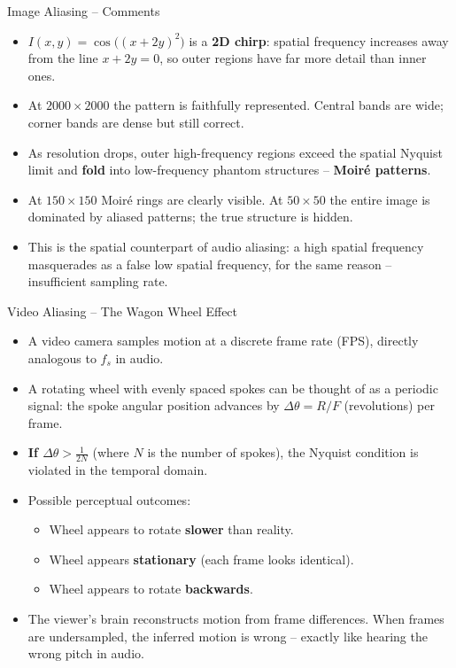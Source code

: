 \documentclass[aspectratio=169]{beamer}
\begin{document}
\begin{frame}{Image Aliasing -- Comments}
  \begin{itemize}
    \item $I(x,y)=\cos\!\big((x+2y)^2\big)$ is a \textbf{2D chirp}: spatial frequency increases away from the line $x+2y=0$, so outer regions have far more detail than inner ones.
    \item At $2000\times2000$ the pattern is faithfully represented. Central bands are wide; corner bands are dense but still correct.
    \item As resolution drops, outer high-frequency regions exceed the spatial Nyquist limit and \textbf{fold} into low-frequency phantom structures -- \textbf{Moir\'{e} patterns}.
    \item At $150\times150$ Moir\'{e} rings are clearly visible. At $50\times50$ the entire image is dominated by aliased patterns; the true structure is hidden.
    \item This is the spatial counterpart of audio aliasing: a high spatial frequency masquerades as a false low spatial frequency, for the same reason -- insufficient sampling rate.
  \end{itemize}
\end{frame}

\begin{frame}{Video Aliasing -- The Wagon Wheel Effect}
  \begin{itemize}
    \item A video camera samples motion at a discrete frame rate (FPS), directly analogous to $f_s$ in audio.
    \item A rotating wheel with evenly spaced spokes can be thought of as a periodic signal: the spoke angular position advances by $\Delta\theta = R/F$ (revolutions) per frame.
    \item \textbf{If $\Delta\theta > \frac{1}{2N}$} (where $N$ is the number of spokes), the Nyquist condition is violated in the temporal domain.
    \item Possible perceptual outcomes:
      \begin{itemize}
        \item Wheel appears to rotate \textbf{slower} than reality.
        \item Wheel appears \textbf{stationary} (each frame looks identical).
        \item Wheel appears to rotate \textbf{backwards}.
      \end{itemize}
    \item The viewer's brain reconstructs motion from frame differences. When frames are undersampled, the inferred motion is wrong -- exactly like hearing the wrong pitch in audio.
  \end{itemize}
\end{frame}
\end{document}
